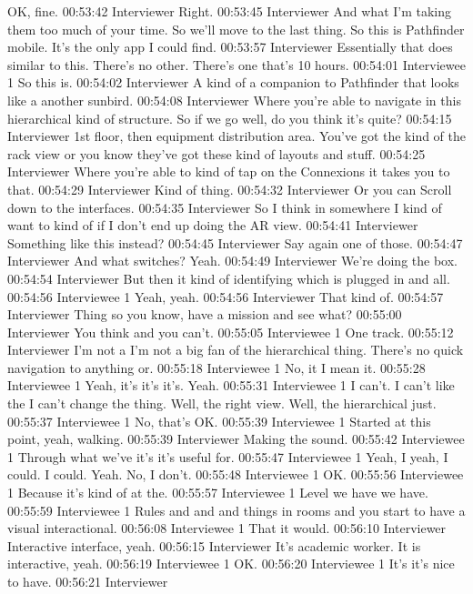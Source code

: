 OK, fine.
00:53:42 Interviewer
Right.
00:53:45 Interviewer
And what I'm taking them too much of your time. So we'll move to the last thing. So this is Pathfinder mobile. It's the only app I could find.
00:53:57 Interviewer
Essentially that does similar to this. There's no other. There's one that's 10 hours.
00:54:01 Interviewee 1
So this is.
00:54:02 Interviewer
A kind of a companion to Pathfinder that looks like a another sunbird.
00:54:08 Interviewer
Where you're able to navigate in this hierarchical kind of structure. So if we go well, do you think it's quite?
00:54:15 Interviewer
1st floor, then equipment distribution area. You've got the kind of the rack view or you know they've got these kind of layouts and stuff.
00:54:25 Interviewer
Where you're able to kind of tap on the Connexions it takes you to that.
00:54:29 Interviewer
Kind of thing.
00:54:32 Interviewer
Or you can Scroll down to the interfaces.
00:54:35 Interviewer
So I think in somewhere I kind of want to kind of if I don't end up doing the AR view.
00:54:41 Interviewer
Something like this instead?
00:54:45 Interviewer
Say again one of those.
00:54:47 Interviewer
And what switches? Yeah.
00:54:49 Interviewer
We're doing the box.
00:54:54 Interviewer
But then it kind of identifying which is plugged in and all.
00:54:56 Interviewee 1
Yeah, yeah.
00:54:56 Interviewer
That kind of.
00:54:57 Interviewer
Thing so you know, have a mission and see what?
00:55:00 Interviewer
You think and you can't.
00:55:05 Interviewee 1
One track.
00:55:12 Interviewer
I'm not a I'm not a big fan of the hierarchical thing. There's no quick navigation to anything or.
00:55:18 Interviewee 1
No, it I mean it.
00:55:28 Interviewee 1
Yeah, it's it's it's. Yeah.
00:55:31 Interviewee 1
I can't. I can't like the I can't change the thing. Well, the right view. Well, the hierarchical just.
00:55:37 Interviewee 1
No, that's OK.
00:55:39 Interviewee 1
Started at this point, yeah, walking.
00:55:39 Interviewer
Making the sound.
00:55:42 Interviewee 1
Through what we've it's it's useful for.
00:55:47 Interviewee 1
Yeah, I yeah, I could. I could. Yeah. No, I don't.
00:55:48 Interviewee 1
OK.
00:55:56 Interviewee 1
Because it's kind of at the.
00:55:57 Interviewee 1
Level we have we have.
00:55:59 Interviewee 1
Rules and and and things in rooms and you start to have a visual interactional.
00:56:08 Interviewee 1
That it would.
00:56:10 Interviewer
Interactive interface, yeah.
00:56:15 Interviewer
It's academic worker. It is interactive, yeah.
00:56:19 Interviewee 1
OK.
00:56:20 Interviewee 1
It's it's nice to have.
00:56:21 Interviewer
